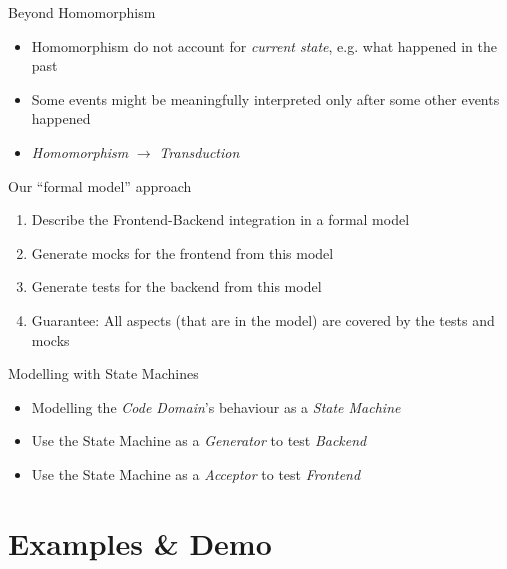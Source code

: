 \begin{frame}[fragile]{Beyond Homomorphism}
  \begin{itemize}
  \item Homomorphism do not account for \emph{current state}, e.g. what happened in the past
  \item Some events might be meaningfully interpreted only after some other events happened
  \item \emph{Homomorphism} $\longrightarrow$ \emph{Transduction}
  \end{itemize}
\end{frame}


\begin{frame}[fragile]{Our ``formal model'' approach}

\begin{enumerate}
\item Describe the Frontend-Backend integration in a formal model
\item Generate mocks for the frontend from this model
\item Generate tests for the backend from this model
\item Guarantee: All aspects (that are in the model) are covered by the tests and mocks
\end{enumerate}

\end{frame}
\begin{frame}[fragile]{Modelling with State Machines}
  \begin{itemize}
  \item Modelling the \emph{Code Domain}'s behaviour as a \emph{State Machine}
  \item Use the State Machine as a \emph{Generator} to test \emph{Backend}
  \item Use the State Machine as a \emph{Acceptor} to test \emph{Frontend}
  \end{itemize}
\end{frame}


\part{Examples \& Demo}

